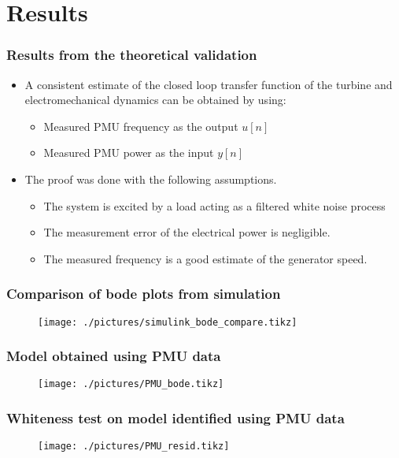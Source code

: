 \section{Results}
\begin{frame}
	\frametitle{Results from the theoretical validation}
	\begin{itemize}
		\item<1-> A consistent estimate of the closed loop transfer function of the turbine and electromechanical dynamics can be obtained by using:
			\begin{itemize}
				\item<2-> Measured PMU frequency as the output $u[n]$
				\item<3-> Measured PMU power as the input $y[n]$
			\end{itemize}
		\item<4-> The proof was done with the following assumptions.
			\begin{itemize}
				\item The system is excited by a load acting as a filtered white noise process
				\item The measurement error of the electrical power is negligible.
				\item The measured frequency is a good estimate of the generator speed.
			\end{itemize}
	\end{itemize}
\end{frame}
\begin{frame}
	\frametitle{Comparison of bode plots from simulation}
	\begin{figure}
		\texttt{[image: ./pictures/simulink\_bode\_compare.tikz]}
	\end{figure}
\end{frame}
\begin{frame}
	\frametitle{Model obtained using PMU data}
	\begin{figure}
		\texttt{[image: ./pictures/PMU\_bode.tikz]}
	\end{figure}
\end{frame}
\begin{frame}
	\frametitle{Whiteness test on model identified using PMU data}
	\begin{figure}
		\texttt{[image: ./pictures/PMU\_resid.tikz]}
	\end{figure}
\end{frame}
